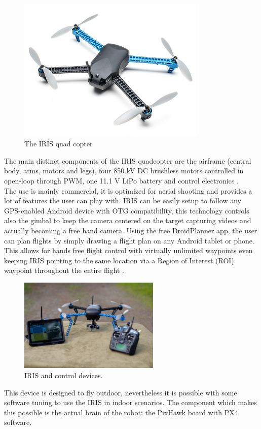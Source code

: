 \begin{figure}[h]
\centering
 \noindent
 \includegraphics[width=0.8\textwidth]{iris.jpg}
 \caption{The IRIS quad copter}
 \label{figure:iris}
\end{figure}
\noindent
The main distinct components of the IRIS quadcopter are the airframe (central body, arms, motors and legs), four 850 kV DC brushless motors controlled in open-loop through PWM, one 11.1 V LiPo battery and control electronics \cite{Delitalia}.\\ 
The use is mainly commercial, it is optimized for aerial shooting and provides a lot of features the user can play with. IRIS can be easily setup to follow any GPS-enabled Android device with OTG compatibility, this technology controls also the gimbal to keep the camera centered on the target capturing videos and actually becoming a free hand camera. Using the free DroidPlanner app, the user can plan flights by simply drawing a flight plan on any Android tablet or phone. This allows for hands free flight control with virtually unlimited waypoints even keeping IRIS pointing to the same location via a Region of Interest (ROI) waypoint throughout the entire flight \cite{IRIS}.


\begin{figure}[h]
 \centering
 \includegraphics[width=0.6\textwidth]{iris_planner.jpg}
 \caption[IRIS and control devices]{IRIS and control devices.}
 \label{figure:iris_planner}
\end{figure}
This device is designed to fly outdoor, nevertheless it is possible with some software tuning to use the IRIS in indoor scenarios. The component which makes this possible is the actual brain of the robot: the PixHawk board with PX4 software. 

